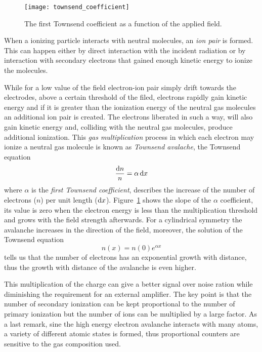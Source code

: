 \begin{figure}[!h]
  \centering
  \texttt{[image: townsend\_coefficient]}
  \caption{The first Townsend coefficient as a function of the applied field\autocite{Knoll:RadMeasurement}.}
  \label{fig:town_coeff}
\end{figure}
When a ionizing particle interacts with neutral molecules, an \emph{ion pair} is
formed. This can happen either by direct interaction with the incident radiation
or by interaction with secondary electrons that gained enough kinetic energy to
ionize the molecules.

While for a low value of the field electron-ion pair simply drift towards the
electrodes, above a certain threshold of the filed, electrons rapidly gain
kinetic energy and if it is greater than the ionization energy of the neutral
gas molecules an additional ion pair is created. The electrons liberated in such
a way, will also gain kinetic energy and, colliding with the neutral gas
molecules, produce additional ionization. This \emph{gas multiplication} process
in which each electron may ionize a neutral gas molecule is known as
\emph{Townsend avalache}, the Townsend equation
\begin{equation}
  \label{eq:townsend}
  \frac{\mathrm{d} n}{n} = \alpha\, \mathrm{d} x
\end{equation}
where $\alpha$ is the \emph{first Townsend coefficient}, describes the increase
of the number of electrons ($n$) per unit length ($\mathrm{d}
x$). Figure~\ref{fig:town_coeff} shows the slope of the $\alpha$ coefficient,
its value is zero when the electron energy is less than the multiplication
threshold and grows with the field strength afterwards. For a cylindrical
symmetry the avalanche increases in the direction of the field, moreover, the
solution of the Townsend equation
\begin{equation}
  \label{eq:townsend_sol}
  n(x) = n(0) e^{\alpha x}
\end{equation}
tells us that the number of electrons has an exponential growth with distance,
thus the growth with distance of the avalanche is even higher.

This multiplication of the charge can give a better signal over noise ration while
diminishing the requirement for an external amplifier. The key point is that the
number of secondary ionization can be kept proportional to the number of primary
ionization but the number of ions can be multiplied by a large factor. As a last
remark, sine the high energy electron avalanche interacts with many atoms, a
variety of different atomic states is formed, thus proportional counters are
sensitive to the gas composition used.

